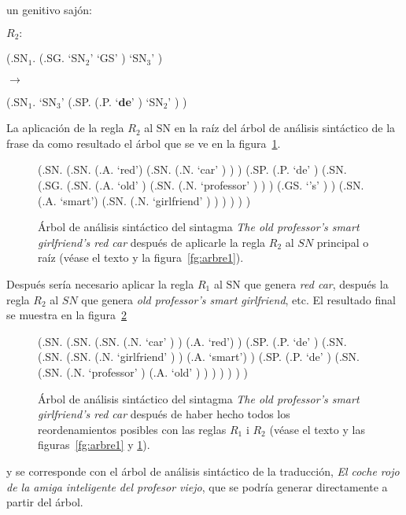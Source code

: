 un genitivo sajón: \begin{center} $R_2:$ \begin{parsetree} (.SN$_1$. (.SG. `SN$_2$' `GS' ) `SN$_3$' ) \end{parsetree} $\longrightarrow$ \begin{parsetree} (.SN$_1$. `SN$_3$' (.SP. (.P. `\textbf{de}' ) `SN$_2$' ) ) \end{parsetree} \end{center} La aplicación de la regla $R_2$ al $\mathrm{SN}$ en la raíz del árbol de análisis sintáctico de la frase da como resultado el árbol que se ve en la figura~\ref{fg:arbre2}. \begin{figure} \begin{center} \begin{parsetree} (.SN. (.SN. (.A. `red') (.SN. (.N. `car' ) ) ) (.SP. (.P. `de' ) (.SN. (.SG. (.SN. (.A. `old' ) (.SN. (.N. `professor' ) ) ) (.GS. `{'s}' ) ) (.SN. (.A. `smart') (.SN. (.N. `girlfriend' ) ) ) ) ) ) \end{parsetree} \end{center} \caption{Árbol de análisis sintáctico del sintagma \emph{The old professor's smart girlfriend's red car} después de aplicarle la regla $R_2$ al $SN$ principal o raíz (véase el texto y la figura~\protect\ref{fg:arbre1}).} \label{fg:arbre2} \end{figure} Después sería necesario aplicar la regla $R_1$ al $\mathrm{SN}$ que genera \emph{red car}, después la regla $R_2$ al $SN$ que genera \emph{old professor's smart girlfriend}, etc. El resultado final se muestra en la figura~\ref{fg:arbre3} \begin{figure} \begin{center} \begin{parsetree} (.SN. (.SN. (.SN. (.N. `car' ) ) (.A. `red') ) (.SP. (.P. `de' ) (.SN. (.SN. (.SN. (.N. `girlfriend' ) ) (.A. `smart') ) (.SP. (.P. `de' ) (.SN. (.SN. (.N. `professor' ) (.A. `old' ) ) ) ) ) ) ) \end{parsetree} \end{center} \caption{Árbol de análisis sintáctico del sintagma \emph{The old professor's smart girlfriend's red car} después de haber hecho todos los reordenamientos posibles con las reglas $R_1$ i $R_2$ (véase el texto y las figuras~\protect\ref{fg:arbre1} y \protect\ref{fg:arbre2}).} \label{fg:arbre3} \end{figure} y se corresponde con el árbol de análisis sintáctico de la traducción, \emph{El coche rojo de la amiga inteligente del profesor viejo}, que se podría generar directamente a partir del árbol. 

